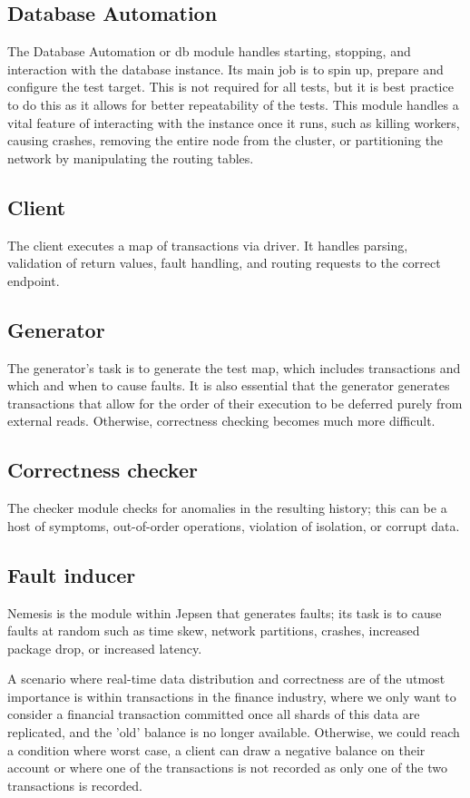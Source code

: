 \documentclass[a4paper,10pt,titlepage]{report}
\begin{document}
\subsection{Database Automation}
 The Database Automation or db module handles starting, stopping, and interaction with the database instance. Its main job is to spin up, prepare and configure the test target. This is not required for all tests, but it is best practice to do this as it allows for better repeatability of the tests. This module handles a vital feature of interacting with the instance once it runs, such as killing workers, causing crashes, removing the entire node from the cluster, or partitioning the network by manipulating the routing tables.

\subsection{Client}
The client executes a map of transactions via driver. It handles parsing, validation of return values, fault handling, and routing requests to the correct endpoint.

\subsection{Generator}
The generator's task is to generate the test map, which includes transactions and which and when to cause faults. It is also essential that the generator generates transactions that allow for the order of their execution to be deferred purely from external reads. Otherwise, correctness checking becomes much more difficult. 

\subsection{Correctness checker}
The checker module checks for anomalies in the resulting history; this can be a host of symptoms, out-of-order operations, violation of isolation, or corrupt data. 

\subsection{Fault inducer}
Nemesis is the module within Jepsen that generates faults; its task is to cause faults at random such as time skew, network partitions, crashes, increased package drop, or increased latency.


A scenario where real-time data distribution and correctness are of the utmost importance is within transactions in the finance industry, where we only want to consider a financial transaction committed once all shards of this data are replicated, and the 'old' balance is no longer available. Otherwise, we could reach a condition where worst case, a client can draw a negative balance on their account or where one of the transactions is not recorded as only one of the two transactions is recorded.\\
\end{document}
